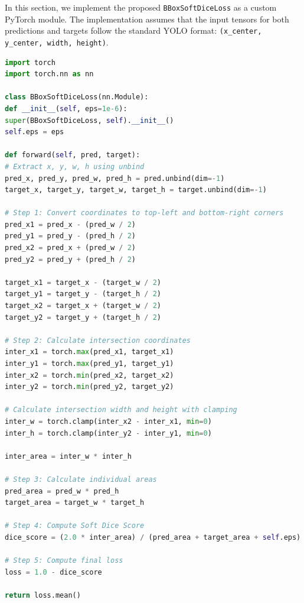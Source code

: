 \documentclass{article}
\begin{document}
In this section, we implement the proposed \texttt{BBoxSoftDiceLoss} as a custom PyTorch module. The implementation assumes that the input tensors for both predictions and targets follow the standard YOLO format: \texttt{(x\_center, y\_center, width, height)}.
\begin{tcolorbox}[colback=yellow!10!white, colframe=yellow!70!black, title=ResNet Bottleneck Implementation, fonttitle=\bfseries]
\begin{lstlisting}[language=Python]
import torch
import torch.nn as nn

class BBoxSoftDiceLoss(nn.Module):
def __init__(self, eps=1e-6):
super(BBoxSoftDiceLoss, self).__init__()
self.eps = eps

def forward(self, pred, target):
# Extract x, y, w, h using unbind
pred_x, pred_y, pred_w, pred_h = pred.unbind(dim=-1)
target_x, target_y, target_w, target_h = target.unbind(dim=-1)

# Step 1: Convert coordinates to top-left and bottom-right corners
pred_x1 = pred_x - (pred_w / 2)
pred_y1 = pred_y - (pred_h / 2)
pred_x2 = pred_x + (pred_w / 2)
pred_y2 = pred_y + (pred_h / 2)

target_x1 = target_x - (target_w / 2)
target_y1 = target_y - (target_h / 2)
target_x2 = target_x + (target_w / 2)
target_y2 = target_y + (target_h / 2)

# Step 2: Calculate intersection coordinates
inter_x1 = torch.max(pred_x1, target_x1)
inter_y1 = torch.max(pred_y1, target_y1)
inter_x2 = torch.min(pred_x2, target_x2)
inter_y2 = torch.min(pred_y2, target_y2)

# Calculate intersection width and height with clamping
inter_w = torch.clamp(inter_x2 - inter_x1, min=0)
inter_h = torch.clamp(inter_y2 - inter_y1, min=0)

inter_area = inter_w * inter_h

# Step 3: Calculate individual areas
pred_area = pred_w * pred_h
target_area = target_w * target_h

# Step 4: Compute Soft Dice Score
dice_score = (2.0 * inter_area) / (pred_area + target_area + self.eps)

# Step 5: Compute final loss
loss = 1.0 - dice_score

return loss.mean()
\end{lstlisting}
\end{tcolorbox}
\end{document}
